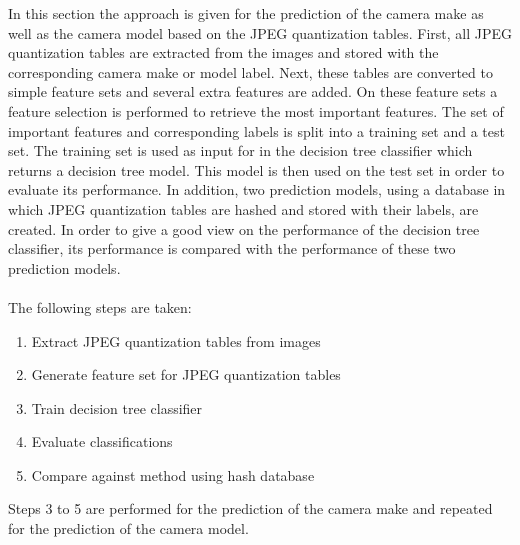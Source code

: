 In this section the approach is given for the prediction of the camera make as well as the camera model based on the JPEG quantization tables.
First, all JPEG quantization tables are extracted from the images and stored with the corresponding camera make or model label. Next, these tables are converted to simple feature sets and several extra features are added. On these feature sets a feature selection is performed to retrieve the most important features. The set of important features and corresponding labels is split into a training set and a test set. The training set is used as input for in the decision tree classifier which returns a decision tree model. This model is then used on the test set in order to evaluate its performance. In addition, two prediction models, using a database in which JPEG quantization tables are hashed and stored with their labels, are created. In order to give a good view on the performance of the decision tree classifier, its performance is compared with the performance of these two prediction models.
\\~\\
The following steps are taken:
\begin{enumerate}
\item Extract JPEG quantization tables from images
\item Generate feature set for JPEG quantization tables
\item Train decision tree classifier 
\item Evaluate classifications
\item Compare against method using hash database
\end{enumerate}
Steps 3 to 5 are performed for the prediction of the camera make and repeated for the prediction of the camera model.


